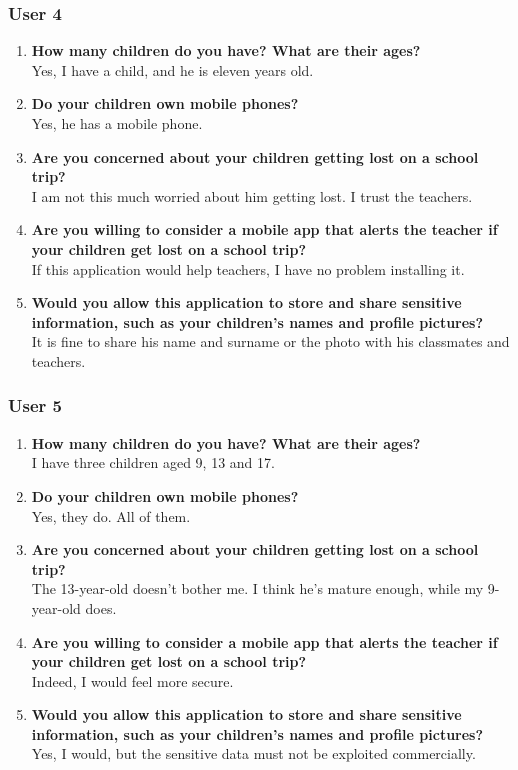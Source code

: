 \subsubsection*{User 4}
\begin{enumerate}
\item \textbf{How many children do you have? What are their ages?}
\\ Yes, I have a child, and he is eleven years old.
\item \textbf{Do your children own mobile phones?}
\\ Yes, he has a mobile phone.
\item \textbf{Are you concerned about your children getting lost on a school trip?}
\\ I am not this much worried about him getting lost. I trust the teachers. 
\item \textbf{Are you willing to consider a mobile app that alerts the teacher if your children get lost on a school trip?}
\\ If this application would help teachers, I have no problem installing it.
\item \textbf{Would you allow this application to store and share sensitive information, such as your children's names and profile pictures?}
\\ It is fine to share his name and surname or the photo with his classmates and teachers.
\end{enumerate}

\subsubsection*{User 5}
\begin{enumerate}
\item \textbf{How many children do you have? What are their ages?}
\\ I have three children aged 9, 13 and 17.
\item \textbf{Do your children own mobile phones?}
\\ Yes, they do. All of them.
\item \textbf{Are you concerned about your children getting lost on a school trip?}
\\ The 13-year-old doesn't bother me. I think he's mature enough, while my 9-year-old does.
\item \textbf{Are you willing to consider a mobile app that alerts the teacher if your children get lost on a school trip?}
\\ Indeed, I would feel more secure.
\item \textbf{Would you allow this application to store and share sensitive information, such as your children's names and profile pictures?}
\\ Yes, I would, but the sensitive data must not be exploited commercially.
\end{enumerate}

